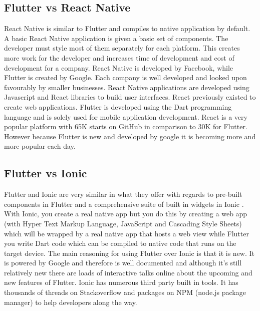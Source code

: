 \subsection{Flutter vs React Native}
React Native is similar to Flutter and compiles to native application by default. A basic React Native application is given a basic set of components. The developer must style most of them separately for each platform. This creates more work for the developer and increases time of development and cost of development for a company. React Native is developed by Facebook, while Flutter is created by Google. Each company is well developed and looked upon favourably by smaller businesses. React Native applications are developed using Javascript and React libraries to build user interfaces. React previously existed to create web applications. Flutter is developed using the Dart programming language and is solely used for mobile application development. React is a very popular platform with 65K starts on GitHub in comparison to 30K for Flutter. However because Flutter is new and developed by google it is becoming more and more popular each day. \cite{FlutterVS_2018} \cite{ReactVsFlutterVsIonic}

\subsection{Flutter vs Ionic}
Flutter and Ionic are very similar in what they offer with regards to pre-built components in Flutter and a comprehensive suite of built in widgets in Ionic \cite{ReactVsFlutterVsIonic}. With Ionic, you create a real native app but you do this by creating a web app (with Hyper Text Markup Language, JavaScript and Cascading Style Sheets) which will be wrapped by a real native app that hosts a web view while Flutter you write Dart code which can be compiled to native code that runs on the target device. The main reasoning for using Flutter over Ionic is that it is new. It is powered by Google and therefore is well documented and although it’s still relatively new there are loads of interactive talks online about the upcoming and new features of Flutter. Ionic has numerous third party built in tools. It has thousands of threads on Stackoverflow and packages on NPM (node.js package manager) to help developers along the way.\cite{FlutterVS_2018}

